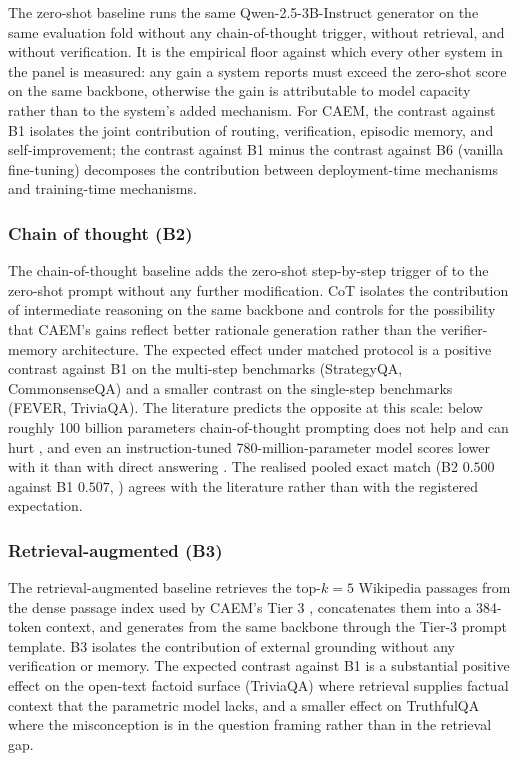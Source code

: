 The zero-shot baseline runs the same Qwen-2.5-3B-Instruct generator on the same evaluation fold without any chain-of-thought trigger, without retrieval, and without verification. It is the empirical floor against which every other system in the panel is measured: any gain a system reports must exceed the zero-shot score on the same backbone, otherwise the gain is attributable to model capacity rather than to the system's added mechanism. For CAEM, the contrast against B1 isolates the joint contribution of routing, verification, episodic memory, and self-improvement; the contrast against B1 minus the contrast against B6 (vanilla fine-tuning) decomposes the contribution between deployment-time mechanisms and training-time mechanisms.

\subsubsection{Chain of thought (B2)}
\label{sec:comp-cot}

The chain-of-thought baseline \cite{wei2022chain} adds the zero-shot step-by-step trigger of \cite{kojima2022large} to the zero-shot prompt without any further modification. CoT isolates the contribution of intermediate reasoning on the same backbone and controls for the possibility that CAEM's gains reflect better rationale generation rather than the verifier-memory architecture. The expected effect under matched protocol is a positive contrast against B1 on the multi-step benchmarks (StrategyQA, CommonsenseQA) and a smaller contrast on the single-step benchmarks (FEVER, TriviaQA). The literature predicts the opposite at this scale: below roughly 100 billion parameters chain-of-thought prompting does not help and can hurt \cite{wei2022chain}, and even an instruction-tuned 780-million-parameter model scores lower with it than with direct answering \cite{JMLR:v25:23-0870}. The realised pooled exact match (B2 $0.500$ against B1 $0.507$, ) agrees with the literature rather than with the registered expectation.

\subsubsection{Retrieval-augmented (B3)}
\label{sec:comp-rag}

The retrieval-augmented baseline retrieves the top-$k = 5$ Wikipedia passages from the dense passage index used by CAEM's Tier 3 \cite{karpukhin-etal-2020-dense,NEURIPS2020_6b493230}, concatenates them into a 384-token context, and generates from the same backbone through the Tier-3 prompt template. B3 isolates the contribution of external grounding without any verification or memory. The expected contrast against B1 is a substantial positive effect on the open-text factoid surface (TriviaQA) where retrieval supplies factual context that the parametric model lacks, and a smaller effect on TruthfulQA where the misconception is in the question framing rather than in the retrieval gap.

